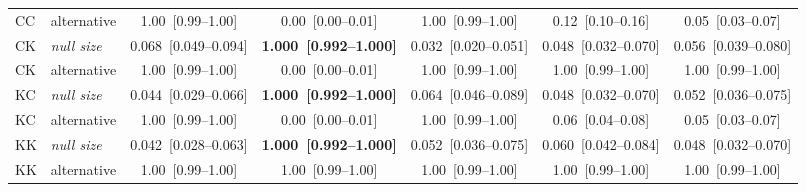 \begin{table}[t]
{\begin{tabular}{llccccc}
CC & alternative & 1.00~[0.99--1.00] & 0.00~[0.00--0.01] & 1.00~[0.99--1.00] & 0.12~[0.10--0.16] & 0.05~[0.03--0.07] \\
CK & \emph{null size} & 0.068~[0.049--0.094] & \textbf{1.000~[0.992--1.000]} & 0.032~[0.020--0.051] & 0.048~[0.032--0.070] & 0.056~[0.039--0.080] \\
CK & alternative & 1.00~[0.99--1.00] & 0.00~[0.00--0.01] & 1.00~[0.99--1.00] & 1.00~[0.99--1.00] & 1.00~[0.99--1.00] \\
KC & \emph{null size} & 0.044~[0.029--0.066] & \textbf{1.000~[0.992--1.000]} & 0.064~[0.046--0.089] & 0.048~[0.032--0.070] & 0.052~[0.036--0.075] \\
KC & alternative & 1.00~[0.99--1.00] & 0.00~[0.00--0.01] & 1.00~[0.99--1.00] & 0.06~[0.04--0.08] & 0.05~[0.03--0.07] \\
KK & \emph{null size} & 0.042~[0.028--0.063] & \textbf{1.000~[0.992--1.000]} & 0.052~[0.036--0.075] & 0.060~[0.042--0.084] & 0.048~[0.032--0.070] \\
KK & alternative & 1.00~[0.99--1.00] & 1.00~[0.99--1.00] & 1.00~[0.99--1.00] & 1.00~[0.99--1.00] & 1.00~[0.99--1.00] \\
\bottomrule
\end{tabular}}
\end{table}
